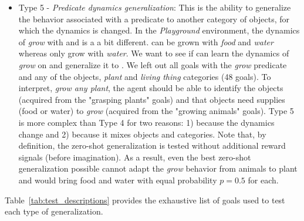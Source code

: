 \begin{itemize}
   \item Type 5 - \textit{Predicate dynamics generalization}: This is the ability to generalize the behavior associated with a predicate to another category of objects, for which the dynamics is changed. In the \textit{Playground} environment, the dynamics of \textit{grow} with  and  is a a bit different.  can be grown with \textit{food} and \textit{water} whereas  only grow with \textit{water}. We want to see if \imagine can learn the dynamics of \textit{grow} on  and generalize it to . We left out all goals with the \textit{grow} predicate and any of the  objects, \textit{plant} and \textit{living thing} categories (48 goals). To interpret, \textit{grow any plant}, the agent should be able to identify the  objects (acquired from the "grasping plants" goals) and that objects need supplies (food or water) to \textit{grow} (acquired from the "growing animals" goals). Type 5 is more complex than Type 4 for two reasons: 1) because the dynamics change and 2) because it mixes objects and categories. Note that, by definition, the zero-shot generalization is tested without additional reward signals (before imagination). As a result, even the best zero-shot generalization possible cannot adapt the \textit{grow} behavior from animals to plant and would bring food and water with equal probability $p=0.5$ for each.
\end{itemize}

 Table~\ref{tab:test_descriptions} provides the exhaustive list of goals used to test each type of generalization.
 






